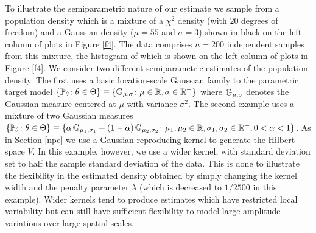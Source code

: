 \documentclass[noinfoline]{imsart}
\begin{document}
To illustrate the semiparametric nature of our estimate we sample from a population density which is a mixture of a $\chi^2$ density (with $20$ degrees of freedom) and a Gaussian density ($\mu = 55$ and $\sigma = 3$) shown in black on the left column of plots in Figure \ref{f4}. The data  comprises $n=200$ independent samples from this mixture, the histogram of which is shown on the left column of plots in Figure \ref{f4}.
 We consider two different semiparametric estimates of the population density. The first uses a basic  location-scale Gaussian family to the parametric target model
 $\{ \Bbb P_\theta \colon \theta \in\Theta \} \equiv \{ \Bbb G_{\mu,\sigma} \colon   \mu \in \Bbb R,  \sigma \in \Bbb R^+ \}$ where $\Bbb G_{\mu,\sigma}$ denotes the Gaussian measure centered at $\mu$ with variance $\sigma^2$.
 The second example uses a
 mixture of two Gaussian measures $\{ \Bbb P_\theta \colon \theta \in\Theta \} \equiv \{ \alpha\,\Bbb G_{\mu_1,\sigma_1} +(1-\alpha)\,\Bbb G_{\mu_2,\sigma_2} \colon  \mu_1, \mu_2 \in \Bbb R,  \sigma_1,\sigma_2 \in \Bbb R^+,   0< \alpha < 1 \}$.
As in Section \ref{npe} we use a Gaussian reproducing kernel to generate the Hilbert space $V$. In this example, however, we use a wider kernel, with standard deviation set to half the sample standard deviation of the data.  This is done to illustrate the flexibility in the estimated density obtained by simply changing the kernel width and the penalty parameter $\lambda$ (which is decreased to $1/2500$ in this example).
Wider kernels tend to produce estimates which have restricted local variability but can still have sufficient flexibility to model large amplitude variations over large spatial scales.
\end{document}
